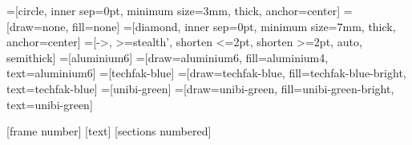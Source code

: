 %
%
%
%
%

\usepackage[utf8]{inputenc}
\usepackage[T1]{fontenc}
\usepackage{graphicx}
\usepackage{amssymb}

\usepackage{tikz}
\usepackage{svg}
\usepackage{unibi-colors}
\usepackage{tango-colors}


\usetikzlibrary{shapes, arrows, backgrounds, intersections, decorations.pathreplacing}

=[circle, inner sep=0pt, minimum size=3mm, thick, anchor=center]
=[draw=none, fill=none]
=[diamond, inner sep=0pt, minimum size=7mm, thick, anchor=center]
=[->, >=stealth', shorten <=2pt, shorten >=2pt, auto, semithick]
=[aluminium6]
=[draw=aluminium6, fill=aluminium4, text=aluminium6]
=[techfak-blue]
=[draw=techfak-blue, fill=techfak-blue-bright, text=techfak-blue]
=[unibi-green]
=[draw=unibi-green, fill=unibi-green-bright, text=unibi-green]



[frame number]{}
[text]
[sections numbered]

